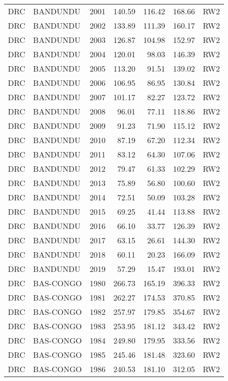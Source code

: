 \begin{longtable}{lllrrrl}
  DRC & BANDUNDU & 2001 & 140.59 & 116.42 & 168.66 & RW2 \\ 
  DRC & BANDUNDU & 2002 & 133.89 & 111.39 & 160.17 & RW2 \\ 
  DRC & BANDUNDU & 2003 & 126.87 & 104.98 & 152.97 & RW2 \\ 
  DRC & BANDUNDU & 2004 & 120.01 & 98.03 & 146.39 & RW2 \\ 
  DRC & BANDUNDU & 2005 & 113.20 & 91.51 & 139.02 & RW2 \\ 
  DRC & BANDUNDU & 2006 & 106.95 & 86.95 & 130.84 & RW2 \\ 
  DRC & BANDUNDU & 2007 & 101.17 & 82.27 & 123.72 & RW2 \\ 
  DRC & BANDUNDU & 2008 & 96.01 & 77.11 & 118.86 & RW2 \\ 
  DRC & BANDUNDU & 2009 & 91.23 & 71.90 & 115.12 & RW2 \\ 
  DRC & BANDUNDU & 2010 & 87.19 & 67.20 & 112.34 & RW2 \\ 
  DRC & BANDUNDU & 2011 & 83.12 & 64.30 & 107.06 & RW2 \\ 
  DRC & BANDUNDU & 2012 & 79.47 & 61.33 & 102.29 & RW2 \\ 
  DRC & BANDUNDU & 2013 & 75.89 & 56.80 & 100.60 & RW2 \\ 
  DRC & BANDUNDU & 2014 & 72.51 & 50.09 & 103.28 & RW2 \\ 
  DRC & BANDUNDU & 2015 & 69.25 & 41.44 & 113.88 & RW2 \\ 
  DRC & BANDUNDU & 2016 & 66.10 & 33.77 & 126.39 & RW2 \\ 
  DRC & BANDUNDU & 2017 & 63.15 & 26.61 & 144.30 & RW2 \\ 
  DRC & BANDUNDU & 2018 & 60.11 & 20.23 & 166.09 & RW2 \\ 
  DRC & BANDUNDU & 2019 & 57.29 & 15.47 & 193.01 & RW2 \\ 
  DRC & BAS-CONGO & 1980 & 266.73 & 165.19 & 396.33 & RW2 \\ 
  DRC & BAS-CONGO & 1981 & 262.27 & 174.53 & 370.85 & RW2 \\ 
  DRC & BAS-CONGO & 1982 & 257.97 & 179.85 & 354.67 & RW2 \\ 
  DRC & BAS-CONGO & 1983 & 253.95 & 181.12 & 343.42 & RW2 \\ 
  DRC & BAS-CONGO & 1984 & 249.80 & 179.95 & 333.56 & RW2 \\ 
  DRC & BAS-CONGO & 1985 & 245.46 & 181.48 & 323.60 & RW2 \\ 
  DRC & BAS-CONGO & 1986 & 240.53 & 181.10 & 312.05 & RW2 \\ 

\end{longtable}
